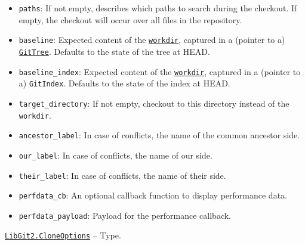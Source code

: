 \begin{adjustwidth}{2em}{0pt}
\begin{itemize}
\item \texttt{paths}: If not empty, describes which paths to search during the checkout.  If empty, the checkout will occur over all files in the repository.


\item \texttt{baseline}: Expected content of the \hyperlink{6689577338311178757}{\texttt{workdir}}, captured in a (pointer to a)  \hyperlink{6242150303858692069}{\texttt{GitTree}}. Defaults to the state of the tree at HEAD.


\item \texttt{baseline\_index}: Expected content of the \hyperlink{6689577338311178757}{\texttt{workdir}}, captured in a (pointer to a)  \texttt{GitIndex}. Defaults to the state of the index at HEAD.


\item \texttt{target\_directory}: If not empty, checkout to this directory instead of the \texttt{workdir}.


\item \texttt{ancestor\_label}: In case of conflicts, the name of the common ancestor side.


\item \texttt{our\_label}: In case of conflicts, the name of {\textquotedbl}our{\textquotedbl} side.


\item \texttt{their\_label}: In case of conflicts, the name of {\textquotedbl}their{\textquotedbl} side.


\item \texttt{perfdata\_cb}: An optional callback function to display performance data.


\item \texttt{perfdata\_payload}: Payload for the performance callback.

\end{itemize}


\end{adjustwidth}
\hypertarget{15963609167797539123}{}
\hyperlink{15963609167797539123}{\texttt{LibGit2.CloneOptions}}  -- {Type.}

